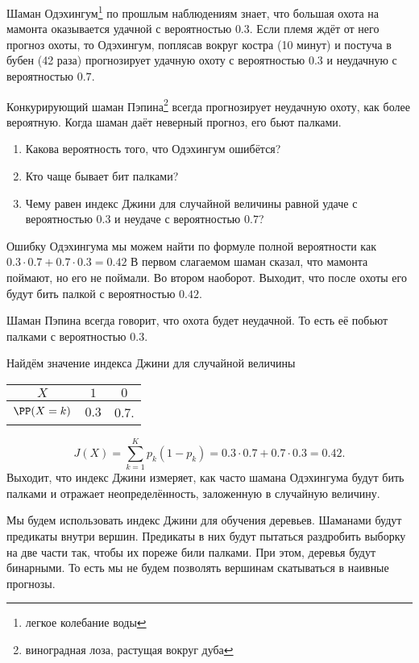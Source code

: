 \documentclass[12pt,a4paper]{article}
\begin{document}
\begin{vkProblem}
    Шаман Одэхингум\footnote{легкое колебание воды} по прошлым наблюдениям знает, что большая охота на мамонта оказывается удачной с вероятностью $0.3$. Если племя ждёт от него прогноз охоты, то Одэхингум, поплясав вокруг костра (10 минут) и постуча в бубен (42 раза) прогнозирует удачную охоту с вероятностью $0.3$ и неудачную с вероятностью $0.7$.
    
    Конкурирующий шаман Пэпина\footnote{виноградная лоза, растущая вокруг дуба} всегда прогнозирует неудачную охоту, как более вероятную. Когда шаман даёт неверный прогноз, его бьют палками.
    \begin{enumerate}
      \item Какова вероятность того, что Одэхингум ошибётся?
      \item Кто чаще бывает бит палками?
      \item Чему равен индекс Джини для случайной величины равной удаче с вероятностью $0.3$ и неудаче с вероятностью $0.7$?
    \end{enumerate}
\end{vkProblem}

\begin{esSolution}
    Ошибку Одэхингума мы можем найти по формуле полной вероятности как $0.3 \cdot 0.7 + 0.7 \cdot 0.3 = 0.42$ В первом слагаемом шаман сказал, что мамонта поймают, но его не поймали. Во втором наоборот. Выходит, что после охоты его будут бить палкой с вероятностью $0.42$.

    Шаман Пэпина всегда говорит, что охота будет неудачной. То есть её побьют палками с вероятностью $0.3$.

    Найдём значение индекса Джини для случайной величины 
    \begin{center}
        \begin{tabular}{c|c|c}
        $X$ & $1$ & $0$   \\ \hline
        $\PP(X = k)$ & $0.3$ & $0.7$.
    \end{tabular}
    \end{center}
    \[
    J(X) = \sum_{k = 1}^{K} p_k (1 - p_k) = 0.3 \cdot 0.7 + 0.7 \cdot 0.3 = 0.42.
    \]
    Выходит, что индекс Джини измеряет, как часто шамана Одэхингума будут бить палками и отражает  неопределённость, заложенную в случайную величину. 
    
    Мы будем использовать индекс Джини для обучения деревьев. Шаманами будут предикаты внутри вершин. Предикаты в них будут пытаться раздробить выборку на две части так, чтобы их пореже били палками. При этом, деревья будут бинарными. То есть мы не будем позволять вершинам скатываться в наивные прогнозы. 
\end{esSolution}
\end{document}
